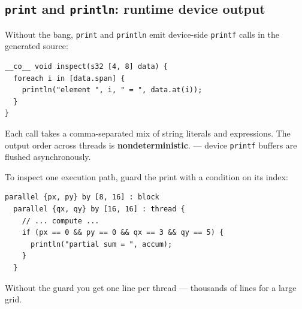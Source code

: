 \subsection*{\texttt{print} and \texttt{println}: runtime device output}

Without the bang, \texttt{print} and \texttt{println} emit device-side \texttt{printf} calls in the generated source:

\begin{lstlisting}[language=croqtile,caption={A runtime inspect kernel}]
__co__ void inspect(s32 [4, 8] data) {
  foreach i in [data.span] {
    println("element ", i, " = ", data.at(i));
  }
}
\end{lstlisting}

Each call takes a comma-separated mix of string literals and expressions. The output order across threads is \textbf{nondeterministic}. --- device \texttt{printf} buffers are flushed asynchronously.

To inspect one execution path, guard the print with a condition on its index:

\begin{lstlisting}[language=croqtile,caption={A print inside a parallel block}]
parallel {px, py} by [8, 16] : block
  parallel {qx, qy} by [16, 16] : thread {
    // ... compute ...
    if (px == 0 && py == 0 && qx == 3 && qy == 5) {
      println("partial sum = ", accum);
    }
  }
\end{lstlisting}

Without the guard you get one line per thread --- thousands of lines for a large grid.
